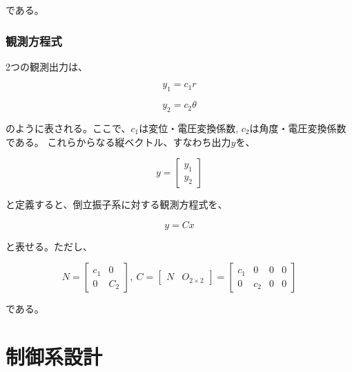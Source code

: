 \documentclass[a4j,11pt,twoside]{jbook}
\begin{document}
である。

\subsection{観測方程式}
2つの観測出力は、

$$
    y_{1} = c_{1} r
$$

$$
    y_{2} = c_{2} \theta
$$

のように表される。ここで、$c_{1}$は変位・電圧変換係数, $c_{2}$は角度・電圧変換係数である。
これらからなる縦ベクトル、すなわち出力$y$を、

$$
    y = 
    \left[
        \begin{array}{c}
            y_{1} \\
            y_{2}
        \end{array}    
    \right]
$$

と定義すると、倒立振子系に対する観測方程式を、

\begin{equation}
    y = Cx
\end{equation}

と表せる。ただし、

$$
    N = 
    \left[
        \begin{array}{cc}
            c_{1}  &  0 \\
            0      &  C_{2}
        \end{array}
    \right],\
    C = 
    \left[
        \begin{array}{cc}
            N  &  O_{2 \times 2}
        \end{array}
    \right]
    =
    \left[
        \begin{array}{cccc}
            c_{1}  &    0    &    0    &    0 \\
            0      &  c_{2}  &    0    &    0
        \end{array}
    \right]
$$

である。


\chapter{制御系設計}



\end{document}

